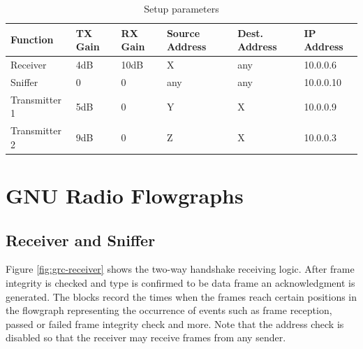 \begin{table}[t]
	\label{tab:measurement-parameters}
	\begin{center}
		\begin{tabular}{p{2.5cm}p{2cm}p{2cm}p{1.5cm}p{1.5cm}p{2cm}}
			\toprule
			Function & TX Gain & RX Gain & Source Address & Dest. Address & IP Address\\
			\midrule
			Receiver 		& 4dB 	& 10dB 	& X 	& any	& 10.0.0.6\\
			Sniffer 		& 0 	& 0 	& any 	& any	& 10.0.0.10 \\
			Transmitter 1 	& 5dB 	& 0 	& Y 	& 	X 	& 10.0.0.9 \\
			Transmitter 2	& 9dB 	& 0 	& Z 	& 	X 	& 10.0.0.3 \\
			\bottomrule	
		\end{tabular}\caption{Setup parameters}
	\end{center}
\end{table}


\section{GNU Radio Flowgraphs}

%
%

\subsection{Receiver and Sniffer}

Figure \ref{fig:grc-receiver} shows the two-way handshake receiving logic. After frame integrity is checked and type is confirmed to be data frame an acknowledgment is generated. The  blocks record the times when the frames reach certain positions in the flowgraph representing the occurrence of events such as frame reception, passed or failed frame integrity check and more. Note that the address check is disabled so that the receiver may receive frames from any sender.


